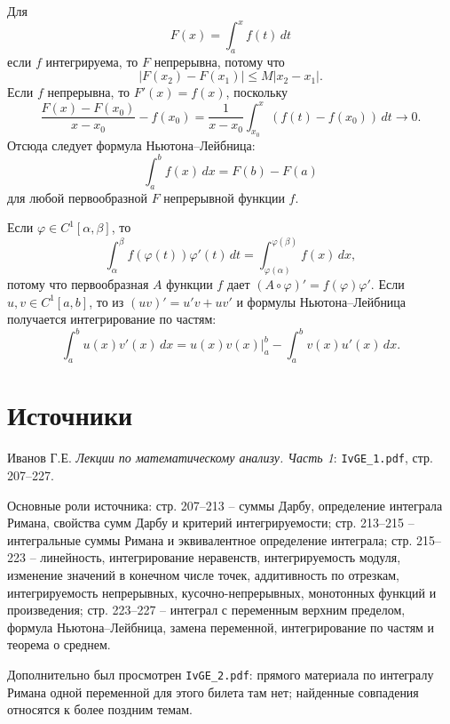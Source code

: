 \documentclass[12pt,a4paper]{article}
\newcommand{\dd}{\,d}
\begin{document}
Для
\[
  F(x)=\int_a^x f(t)\dd t
\]
если \(f\) интегрируема, то \(F\) непрерывна, потому что
\[
  |F(x_2)-F(x_1)|\le M|x_2-x_1|.
\]
Если \(f\) непрерывна, то \(F'(x)=f(x)\), поскольку
\[
  \frac{F(x)-F(x_0)}{x-x_0}-f(x_0)
  =
  \frac{1}{x-x_0}\int_{x_0}^x(f(t)-f(x_0))\dd t\to0.
\]
Отсюда следует формула Ньютона--Лейбница:
\[
  \int_a^b f(x)\dd x=F(b)-F(a)
\]
для любой первообразной \(F\) непрерывной функции \(f\).

Если \(\varphi\in C^1[\alpha,\beta]\), то
\[
  \int_\alpha^\beta f(\varphi(t))\varphi'(t)\dd t
  =
  \int_{\varphi(\alpha)}^{\varphi(\beta)} f(x)\dd x,
\]
потому что первообразная \(A\) функции \(f\) дает
\((A\circ\varphi)'=f(\varphi)\varphi'\). Если \(u,v\in C^1[a,b]\), то из
\((uv)'=u'v+uv'\) и формулы Ньютона--Лейбница получается интегрирование по
частям:
\[
  \int_a^b u(x)v'(x)\dd x
  =
  u(x)v(x)\Big|_a^b-\int_a^b v(x)u'(x)\dd x.
\]

\section*{Источники}

Иванов Г.Е. \emph{Лекции по математическому анализу. Часть 1}:
\texttt{IvGE\_1.pdf}, стр. 207--227.

Основные роли источника: стр. 207--213 -- суммы Дарбу, определение интеграла
Римана, свойства сумм Дарбу и критерий интегрируемости; стр. 213--215 --
интегральные суммы Римана и эквивалентное определение интеграла; стр. 215--223
-- линейность, интегрирование неравенств, интегрируемость модуля, изменение
значений в конечном числе точек, аддитивность по отрезкам, интегрируемость
непрерывных, кусочно-непрерывных, монотонных функций и произведения; стр.
223--227 -- интеграл с переменным верхним пределом, формула
Ньютона--Лейбница, замена переменной, интегрирование по частям и теорема о
среднем.

Дополнительно был просмотрен \texttt{IvGE\_2.pdf}: прямого материала по
интегралу Римана одной переменной для этого билета там нет; найденные
совпадения относятся к более поздним темам.
\end{document}
